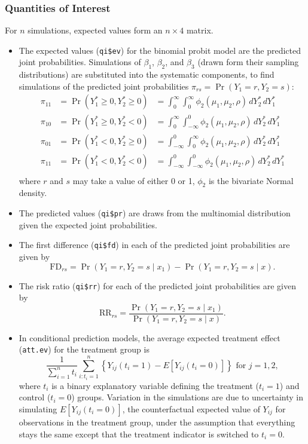 \subsubsection{Quantities of Interest}
For $n$ simulations, expected values form an $n \times 4$
matrix.  
\begin{itemize}
\item The expected values ({\tt qi\$ev}) for the binomial probit model
  are the predicted joint probabilities. Simulations of $\beta_1$,
  $\beta_2$, and $\beta_3$ (drawn form their sampling distributions)
  are substituted into the systematic components, to find simulations
  of the predicted joint probabilities $\pi_{rs}=\Pr(Y_1=r, Y_2=s)$:
\begin{eqnarray*}
\pi_{11} &= \Pr(Y_1^* \geq 0 , Y_2^* \geq 0) &= \int_0^{\infty}
\int_0^{\infty} \phi_2 (\mu_1, \mu_2, \rho) \, dY_2^*\, dY_1^* \\
\pi_{10} &= \Pr(Y_1^* \geq 0 , Y_2^* < 0)  &= \int_0^{\infty}
\int_{-\infty}^{0} \phi_2 (\mu_1, \mu_2, \rho) \, dY_2^*\, dY_1^*\\
\pi_{01} &= \Pr(Y_1^* < 0 , Y_2^* \geq 0)  &= \int_{-\infty}^{0}
\int_0^{\infty} \phi_2 (\mu_1, \mu_2, \rho) \, dY_2^*\, dY_1^*\\
\pi_{11} &= \Pr(Y_1^* < 0 , Y_2^* < 0)  &= \int_{-\infty}^{0}
\int_{-\infty}^{0} \phi_2 (\mu_1, \mu_2, \rho) \, dY_2^*\, dY_1^*\\
\end{eqnarray*}
where $r$ and $s$ may take a value of either 0 or 1, $\phi_2$ is the
bivariate Normal density.
  
\item The predicted values ({\tt qi\$pr}) are draws from the
  multinomial distribution given the expected joint probabilities.  

\item The first difference ({\tt qi\$fd}) in each of the predicted joint
  probabilities are given by
  $$\textrm{FD}_{rs} = \Pr(Y_1=r, Y_2=s \mid x_1)-\Pr(Y_1=r, Y_2=s
  \mid x).$$
  
\item The risk ratio ({\tt qi\$rr}) for each of the predicted joint
  probabilities are given by
\begin{equation*}
\textrm{RR}_{rs} = \frac{\Pr(Y_1=r, Y_2=s \mid x_1)}{\Pr(Y_1=r, Y_2=s \mid x)}.
\end{equation*}

\item In conditional prediction models, the average expected treatment
  effect ({\tt att.ev}) for the treatment group is 
    \begin{equation*} \frac{1}{\sum_{i=1}^n t_i}\sum_{i:t_i=1}^n \left\{ Y_{ij}(t_i=1) -
      E[Y_{ij}(t_i=0)] \right\} \textrm{ for } j = 1,2,
    \end{equation*} 
    where $t_i$ is a binary explanatory variable defining the treatment
    ($t_i=1$) and control ($t_i=0$) groups.  Variation in the
    simulations are due to uncertainty in simulating $E[Y_{ij}(t_i=0)]$,
    the counterfactual expected value of $Y_{ij}$ for observations in the
    treatment group, under the assumption that everything stays the
    same except that the treatment indicator is switched to $t_i=0$.


\end{itemize}
